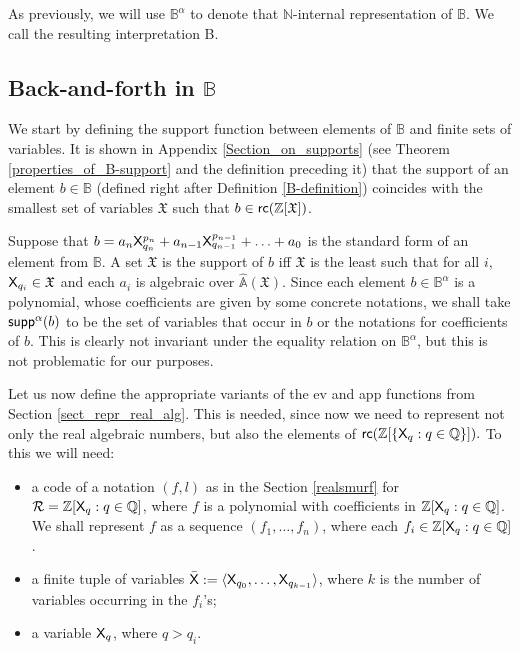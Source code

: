 \documentclass{amsart}
\newcommand{\mc}[1]{\mathcal #1}
\newcommand{\tupel}[1]{{\langle #1 \rangle}}
\newcommand{\X}{{\sf X}}
\newcommand{\rc}{{\sf rc}}
\begin{document}
As previously, we will use $\mathbb{B}^{\alpha}$ to denote that $\mathbb{N}$-internal representation of $\mathbb{B}$.
We call the resulting interpretation {\sf B}.

 \subsection{ Back-and-forth in $\mathbb{B}$}
We start by defining the support function between
 elements of $\mathbb{B}$ and finite sets of variables. It is shown in Appendix \ref{Section_on_supports} (see Theorem \ref{properties_of_B-support} and the definition preceding it) that the support of an element $b\in \mathbb{B}$ (defined right after Definition \ref{B-definition}) coincides with the smallest set of variables $\mathfrak{X}$ such that $b\in \rc(\mathbb{Z}[\mathfrak{X}])$.
 
 Suppose that $b=a_{n}\X_{q_n}^{p_n} + a_{n-1}\X_{q_{n-1}}^{p_{n-1}} + \ldots + a_0$ is the standard form of an element from $\mathbb{B}$. A set $\mathfrak{X}$ is the support of $b$ iff $\mathfrak{X}$ is the least such that for all $i$, $\X_{q_i}\in \mathfrak{X}$ and each $a_i$ is algebraic over $\hat{\mathbb{A}}(\mathfrak{X})$. Since each element $b\in \mathbb{B}^{\alpha}$ is a polynomial, whose coefficients are given by some concrete notations, we shall take ${\sf supp}^{\alpha}(b)$ to be the set of variables that occur in $b$ or the notations for coefficients of $b$. This is clearly not invariant under the equality relation on $\mathbb{B}^{\alpha}$, but this is not problematic for our purposes. 

Let us now define the appropriate variants of the {\sf ev} and {\sf app} functions from Section \ref{sect_repr_real_alg}. This is needed, since now we need to represent not only the real algebraic numbers, but also the elements of $\rc(\mathbb{Z}[\{\X_q : q\in\mathbb{Q}\}]).$ To this we will need: 
\begin{itemize}
    \item a code of a notation $(f,l)$ as in the Section \ref{realsmurf} for $\mc R = \mathbb{Z}[\X_q:q\in\mathbb{Q}]$, where $f$ is a polynomial 
    with coefficients in 
    $\mathbb{Z}[\X_q : q\in\mathbb{Q}]$. We shall represent $f$ as a sequence 
    $(f_1,\ldots,f_n)$, where each $f_i\in \mathbb{Z}[\X_q : q\in\mathbb{Q}]$.
    \item a finite tuple of variables $\bar{\X}:=\tupel{\X_{q_0},\ldots,\X_{q_{k-1}}}$, 
    where $k$ is the number of variables occurring in the $f_i$'s;
    \item a variable $\X_q$, where $q>q_i$.
\end{itemize} 
\end{document}
